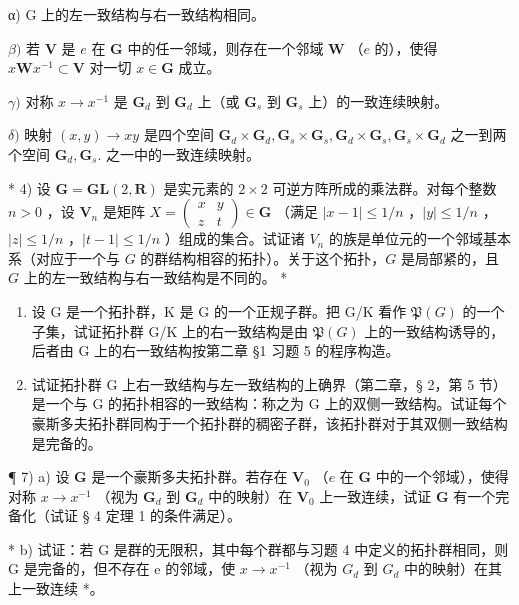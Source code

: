 α) G 上的左一致结构与右一致结构相同。

\(\beta)\) 若 \(\mathbf{V}\) 是 \(e\) 在 \(\mathbf{G}\) 中的任一邻域，则存在一个邻域 \(\mathbf{W}\) （\(e\) 的），使得 \(x\mathbf{W}x^{-1} \subset \mathbf{V}\) 对一切 \(x \in \mathbf{G}\) 成立。

\(\gamma)\) 对称 \(x \to x^{-1}\) 是 \(\mathbf{G}_d\) 到 \(\mathbf{G}_d\) 上（或 \(\mathbf{G}_s\) 到 \(\mathbf{G}_s\) 上）的一致连续映射。

\(\delta)\) 映射 \((x,y)\to xy\) 是四个空间 \(\mathbf{G}_d\times \mathbf{G}_d,\mathbf{G}_s\times \mathbf{G}_s,\mathbf{G}_d\times \mathbf{G}_s,\mathbf{G}_s\times \mathbf{G}_d\) 之一到两个空间 \(\mathbf{G}_d,\mathbf{G}_s.\) 之一中的一致连续映射。

* 4) 设 \(\mathbf{G} = \mathbf{GL}(2, \mathbf{R})\) 是实元素的 \(2 \times 2\) 可逆方阵所成的乘法群。对每个整数 \(n > 0\) ，设 \(\mathbf{V}_n\) 是矩阵 \(X = \begin{pmatrix} x & y \\ z & t \end{pmatrix} \in \mathbf{G}\) （满足 \(|x - 1| \leqslant 1/n\) ，\(|y| \leqslant 1/n\) ，\(|z| \leqslant 1/n\) ，\(|t - 1| \leqslant 1/n\) ）组成的集合。试证诸 \(V_n\) 的族是单位元的一个邻域基本系（对应于一个与 \(G\) 的群结构相容的拓扑）。关于这个拓扑，\(G\) 是局部紧的，且 \(G\) 上的左一致结构与右一致结构是不同的。 *

\begin{enumerate}
\def\labelenumi{\arabic{enumi})}
\setcounter{enumi}{4}
\item
  设 G 是一个拓扑群，K 是 G 的一个正规子群。把 G/K 看作 \(\mathfrak{P}(G)\) 的一个子集，试证拓扑群 G/K 上的右一致结构是由 \(\mathfrak{P}(G)\) 上的一致结构诱导的，后者由 G 上的右一致结构按第二章 §1 习题 5 的程序构造。
\item
  试证拓扑群 G 上右一致结构与左一致结构的上确界（第二章，§ 2，第 5 节）是一个与 G 的拓扑相容的一致结构：称之为 G 上的双侧一致结构。试证每个豪斯多夫拓扑群同构于一个拓扑群的稠密子群，该拓扑群对于其双侧一致结构是完备的。
\end{enumerate}

¶ 7) a) 设 \(\mathbf{G}\) 是一个豪斯多夫拓扑群。若存在 \(\mathbf{V}_0\) （\(e\) 在 \(\mathbf{G}\) 中的一个邻域），使得对称 \(x \to x^{-1}\) （视为 \(\mathbf{G}_d\) 到 \(\mathbf{G}_d\) 中的映射）在 \(\mathbf{V}_0\) 上一致连续，试证 \(\mathbf{G}\) 有一个完备化（试证 § 4 定理 1 的条件满足）。

* b) 试证：若 G 是群的无限积，其中每个群都与习题 4 中定义的拓扑群相同，则 G 是完备的，但不存在 e 的邻域，使 \(x \rightarrow x^{-1}\) （视为 \(G_{d}\) 到 \(G_{d}\) 中的映射）在其上一致连续 *。


